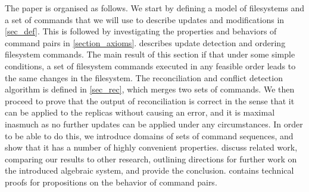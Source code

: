The paper is organised as follows.
We start by defining a model of filesystems and a set of commands
that we will use to describe updates and modifications in \cref{sec_def}.
This is followed by investigating the properties and behaviors
of command pairs in \cref{section_axioms}.
 describes update detection and ordering filesystem commands.
The main result of this section if that under some simple conditions,
a set of filesystem commands executed in any feasible order leads
to the same changes in the filesystem.
The reconciliation and conflict detection algorithm is defined in
\cref{sec_rec}, which merges two sets of commands.
We then proceed to prove that the output of reconciliation
is correct in the sense that 
it can be applied to the replicas without causing an error,
and it is maximal
inasmuch as no further updates can be applied under any circumstances.
In order to be able to do this, we introduce
domains of sets of command sequences,
and show that it has a number of highly convenient properties.
discuss related work, comparing our results to other research,
outlining directions for further work
on the introduced algebraic system, and provide the conclusion.
 contains technical proofs for propositions on the behavior of command pairs.

